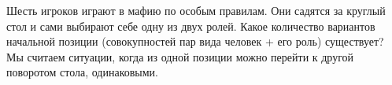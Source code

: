 \question 
Шесть игроков играют в мафию по особым правилам. Они садятся за круглый стол и сами выбирают себе одну из двух ролей. Какое количество вариантов начальной позиции (совокупностей пар вида человек + его роль) существует? Мы считаем ситуации, когда из одной позиции можно перейти к другой поворотом стола, одинаковыми.

